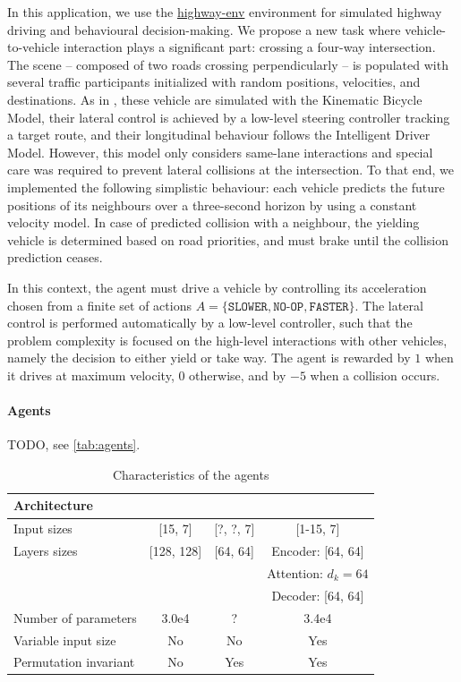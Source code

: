 \documentclass{article}
\begin{document}
{In this application, we use the \href{https://github.com/eleurent/highway-env}{highway-env} environment \citep{highway-env} for simulated highway driving and behavioural decision-making. We propose a new task where vehicle-to-vehicle interaction plays a significant part: crossing a four-way intersection.
The scene -- composed of two roads crossing perpendicularly -- is populated with several traffic participants initialized with random positions, velocities, and destinations. As in \citep{highway-env}, these vehicle are simulated with the Kinematic Bicycle Model, their lateral control is achieved by a low-level steering controller tracking a target route, and their longitudinal behaviour follows the Intelligent Driver Model. However, this model only considers same-lane interactions and special care was required to prevent lateral collisions at the intersection. To that end, we implemented the following simplistic behaviour: each vehicle predicts the future positions of its neighbours over a three-second horizon by using a constant velocity model. In case of predicted collision with a neighbour, the yielding vehicle is determined based on road priorities, and must brake until the collision prediction ceases. 

In this context, the agent must drive a vehicle by controlling its acceleration chosen from a finite set of actions $A = \{\texttt{SLOWER}, \texttt{NO-OP}, \texttt{FASTER}\}$. The lateral control is performed automatically by a low-level controller, such that the problem complexity is focused on the high-level interactions with other vehicles, namely the decision to either yield or take way. The agent is rewarded by $1$ when it drives at maximum velocity, $0$ otherwise, and by $-5$ when a collision occurs.

\paragraph{Agents}

TODO, see \autoref{tab:agents}.


\begin{table}[tp]
	\centering
	\begin{threeparttable}
		\caption{Characteristics of the agents}
		\label{tab:agents}
		\begin{tabular}{lccc}
			\toprule
			Architecture & \MLPC & \MLPG & \EgoAtt \\
			\midrule 
			Input sizes & [15, 7] & [?, ?, 7] & [1-15, 7] \\
			Layers sizes & [128, 128] &  [64, 64] & Encoder: [64, 64] \\
			& & & Attention: $d_k=64$\\
			& & & Decoder: [64, 64]\\
			Number of parameters & 3.0e4 & ? & 3.4e4 \\
			Variable input size & No & No & Yes \\
			Permutation invariant & No & Yes & Yes \\
			\bottomrule
		\end{tabular}
	\end{threeparttable}
\end{table}

}
\end{document}
